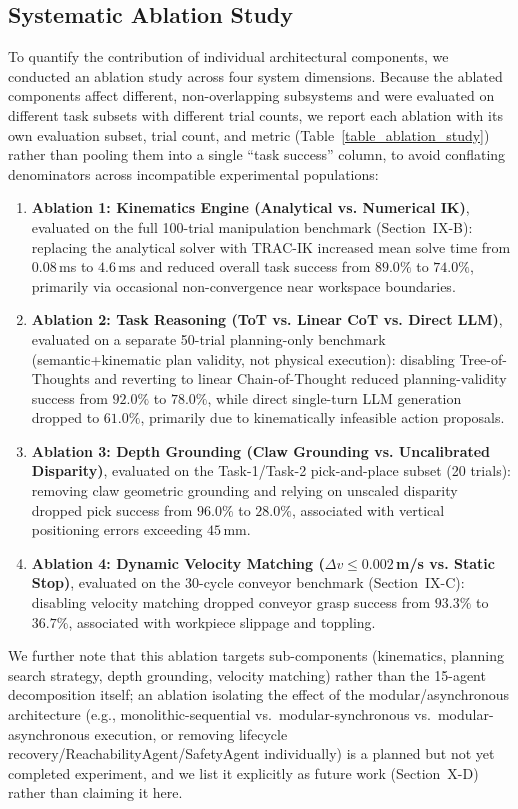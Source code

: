 \documentclass[journal]{IEEEtran}
\begin{document}
\subsection{Systematic Ablation Study}
To quantify the contribution of individual architectural components, we conducted an ablation study across four system dimensions. Because the ablated components affect different, non-overlapping subsystems and were evaluated on different task subsets with different trial counts, we report each ablation with its own evaluation subset, trial count, and metric (Table~\ref{table_ablation_study}) rather than pooling them into a single ``task success'' column, to avoid conflating denominators across incompatible experimental populations:
\begin{enumerate}
    \item \textbf{Ablation 1: Kinematics Engine (Analytical vs. Numerical IK)}, evaluated on the full 100-trial manipulation benchmark (Section~IX-B): replacing the analytical solver with TRAC-IK increased mean solve time from $0.08$\,ms to $4.6$\,ms and reduced overall task success from $89.0\%$ to $74.0\%$, primarily via occasional non-convergence near workspace boundaries.
    \item \textbf{Ablation 2: Task Reasoning (ToT vs. Linear CoT vs. Direct LLM)}, evaluated on a separate 50-trial planning-only benchmark (semantic+kinematic plan validity, not physical execution): disabling Tree-of-Thoughts and reverting to linear Chain-of-Thought reduced planning-validity success from $92.0\%$ to $78.0\%$, while direct single-turn LLM generation dropped to $61.0\%$, primarily due to kinematically infeasible action proposals.
    \item \textbf{Ablation 3: Depth Grounding (Claw Grounding vs. Uncalibrated Disparity)}, evaluated on the Task-1/Task-2 pick-and-place subset (20 trials): removing claw geometric grounding and relying on unscaled disparity dropped pick success from $96.0\%$ to $28.0\%$, associated with vertical positioning errors exceeding $45$\,mm.
    \item \textbf{Ablation 4: Dynamic Velocity Matching ($\Delta v \le 0.002$\,m/s vs. Static Stop)}, evaluated on the 30-cycle conveyor benchmark (Section~IX-C): disabling velocity matching dropped conveyor grasp success from $93.3\%$ to $36.7\%$, associated with workpiece slippage and toppling.
\end{enumerate}
We further note that this ablation targets sub-components (kinematics, planning search strategy, depth grounding, velocity matching) rather than the 15-agent decomposition itself; an ablation isolating the effect of the modular/asynchronous architecture (e.g., monolithic-sequential vs.\ modular-synchronous vs.\ modular-asynchronous execution, or removing lifecycle recovery/ReachabilityAgent/SafetyAgent individually) is a planned but not yet completed experiment, and we list it explicitly as future work (Section~X-D) rather than claiming it here.
\end{document}
